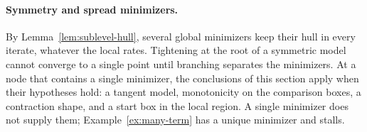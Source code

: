 \paragraph{Symmetry and spread minimizers.} By Lemma~\ref{lem:sublevel-hull},
several global minimizers keep their hull in every iterate, whatever the
local rates. Tightening at the root of a symmetric model cannot converge to a single
point until branching separates the minimizers. At a node that contains a
single minimizer, the conclusions of this section apply when their
hypotheses hold: a tangent model, monotonicity on the comparison boxes, a
contraction shape, and a start box in the local region. A single minimizer
does not supply them; Example~\ref{ex:many-term} has a unique minimizer and
stalls.

